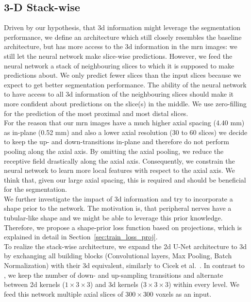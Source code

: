\subsection{3-D Stack-wise}
Driven by our hypothesis, that \gls{3d} information might leverage the segmentation performance, we define an architecture which still closely resembles the baseline architecture, but has more access to the \gls{3d} information in the \gls{mrn} images: we still let the neural network make slice-wise predictions. However, we feed the neural network a stack of neighbouring slices to which it is supposed to make predictions about. We only predict fewer slices than the input slices because we expect to get better segmentation performance. The ability of the neural network to have access to all \gls{3d} information of the neighbouring slices should make it more confident about predictions on the slice(s) in the middle. We use zero-filling for the prediction of the most proximal and most distal slices.\\
For the reason that our \gls{mrn} images have a much higher axial spacing (4.40 mm) as in-plane (0.52 mm) and also a lower axial resolution (30 to 60 slices) we decide to keep the up- and down-transitions in-plane and therefore do not perform pooling along the axial axis. By omitting the axial pooling, we reduce the receptive field drastically along the axial axis. Consequently, we constrain the neural network to learn more local features with respect to the axial axis. We think that, given our large axial spacing, this is required and should be beneficial for the segmentation.\\
We further investigate the impact of \gls{3d} information and try to incorporate a shape prior to the network. The motivation is, that peripheral nerves have a tubular-like shape and we might be able to leverage this prior knowledge. Therefore, we propose a shape-prior loss function based on projections, which is explained in detail in Section~\ref{sec:train_loss_proj}.\\
To realize the stack-wise architecture, we expand the \gls{2d} U-Net architecture to \gls{3d} by exchanging all building blocks (Convolutional layers, Max Pooling, Batch Normalization) with their \gls{3d} equivalent, similarly to Cicek et al.~\cite{Cicek20163DAnnotation}. In contrast to \cite{Cicek20163DAnnotation}, we keep the number of down- and up-sampling transitions and alternate between \gls{2d} kernels ($1 \times 3 \times 3$) and \gls{3d} kernels ($3 \times 3 \times 3$) within every level.
We feed this network multiple axial slices of $300 \times 300$ voxels as an input.
